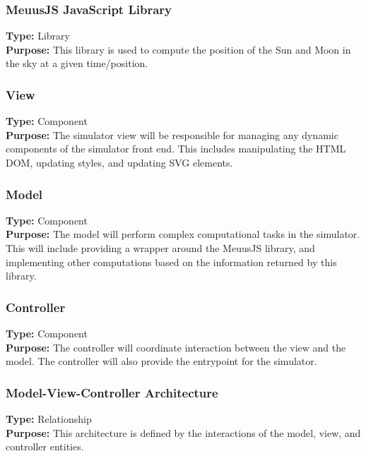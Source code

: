 \documentclass[10pt, onecolumn, draftclsnofoot, letterpaper, compsoc]{IEEEtran}
\begin{document}
  \subsubsection{MeuusJS JavaScript Library}
  \textbf{Type:} Library \\
  \textbf{Purpose:} This library is used to compute the position
  of the Sun and Moon in the sky at a given time/position. \\

  \subsubsection{View}
  \textbf{Type:} Component \\
  \textbf{Purpose:} The simulator view will be responsible
  for managing any dynamic components of the simulator front end.
  This includes manipulating the HTML DOM, updating styles, and updating SVG
  elements. \\

  \subsubsection{Model}
  \textbf{Type:} Component \\
  \textbf{Purpose:} The model will perform complex computational tasks in the simulator.
  This will include providing a wrapper around the MeuusJS library, and implementing
  other computations based on the information returned by this library. \\

  \subsubsection{Controller}
  \textbf{Type:} Component \\
  \textbf{Purpose:} The controller will coordinate interaction between the view and
  the model. The controller will also provide the entrypoint for the simulator. \\

  \subsubsection{Model-View-Controller Architecture}
  \textbf{Type:} Relationship \\
  \textbf{Purpose:} This architecture is defined by the interactions of the model,
  view, and controller entities. \\
\end{document}
